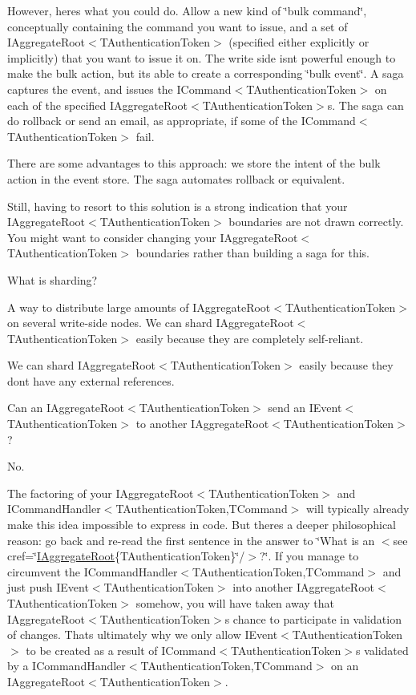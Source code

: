 However, here\textquotesingle{}s what you could do. Allow a new kind of \char`\"{}bulk command\char`\"{}, conceptually containing the command you want to issue, and a set of I\+Aggregate\+Root$<$\+T\+Authentication\+Token$>$ (specified either explicitly or implicitly) that you want to issue it on. The write side isn\textquotesingle{}t powerful enough to make the bulk action, but it\textquotesingle{}s able to create a corresponding \char`\"{}bulk event\char`\"{}. A saga captures the event, and issues the I\+Command$<$\+T\+Authentication\+Token$>$ on each of the specified I\+Aggregate\+Root$<$\+T\+Authentication\+Token$>$s. The saga can do rollback or send an email, as appropriate, if some of the I\+Command$<$\+T\+Authentication\+Token$>$ fail. 

There are some advantages to this approach\+: we store the intent of the bulk action in the event store. The saga automates rollback or equivalent. 

Still, having to resort to this solution is a strong indication that your I\+Aggregate\+Root$<$\+T\+Authentication\+Token$>$ boundaries are not drawn correctly. You might want to consider changing your I\+Aggregate\+Root$<$\+T\+Authentication\+Token$>$ boundaries rather than building a saga for this. 

What is sharding? 

A way to distribute large amounts of I\+Aggregate\+Root$<$\+T\+Authentication\+Token$>$ on several write-\/side nodes. We can shard I\+Aggregate\+Root$<$\+T\+Authentication\+Token$>$ easily because they are completely self-\/reliant. 

We can shard I\+Aggregate\+Root$<$\+T\+Authentication\+Token$>$ easily because they don\textquotesingle{}t have any external references. 

Can an I\+Aggregate\+Root$<$\+T\+Authentication\+Token$>$ send an I\+Event$<$\+T\+Authentication\+Token$>$ to another I\+Aggregate\+Root$<$\+T\+Authentication\+Token$>$? 

No. 

The factoring of your I\+Aggregate\+Root$<$\+T\+Authentication\+Token$>$ and I\+Command\+Handler$<$\+T\+Authentication\+Token,\+T\+Command$>$ will typically already make this idea impossible to express in code. But there\textquotesingle{}s a deeper philosophical reason\+: go back and re-\/read the first sentence in the answer to \char`\"{}\+What is an $<$see cref=\char`\"{}\hyperlink{interfaceCqrs_1_1Domain_1_1IAggregateRoot}{I\+Aggregate\+Root}\{T\+Authentication\+Token\}\char`\"{}/$>$?\char`\"{}. If you manage to circumvent the I\+Command\+Handler$<$\+T\+Authentication\+Token,\+T\+Command$>$ and just push I\+Event$<$\+T\+Authentication\+Token$>$ into another I\+Aggregate\+Root$<$\+T\+Authentication\+Token$>$ somehow, you will have taken away that I\+Aggregate\+Root$<$\+T\+Authentication\+Token$>$\textquotesingle{}s chance to participate in validation of changes. That\textquotesingle{}s ultimately why we only allow I\+Event$<$\+T\+Authentication\+Token$>$ to be created as a result of I\+Command$<$\+T\+Authentication\+Token$>$s validated by a I\+Command\+Handler$<$\+T\+Authentication\+Token,\+T\+Command$>$ on an I\+Aggregate\+Root$<$\+T\+Authentication\+Token$>$. 

